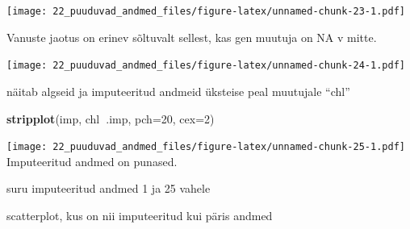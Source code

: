 \documentclass[]{book}
\newenvironment{Shaded}{\begin{snugshade}}{\end{snugshade}}
\newcommand{\KeywordTok}[1]{\textcolor[rgb]{0.13,0.29,0.53}{\textbf{#1}}}
\newcommand{\DataTypeTok}[1]{\textcolor[rgb]{0.13,0.29,0.53}{#1}}
\newcommand{\DecValTok}[1]{\textcolor[rgb]{0.00,0.00,0.81}{#1}}
\newcommand{\StringTok}[1]{\textcolor[rgb]{0.31,0.60,0.02}{#1}}
\newcommand{\OtherTok}[1]{\textcolor[rgb]{0.56,0.35,0.01}{#1}}
\newcommand{\OperatorTok}[1]{\textcolor[rgb]{0.81,0.36,0.00}{\textbf{#1}}}
\newcommand{\NormalTok}[1]{#1}
\begin{document}
\texttt{[image: 22\_puuduvad\_andmed\_files/figure-latex/unnamed-chunk-23-1.pdf]}

Vanuste jaotus on erinev sõltuvalt sellest, kas gen muutuja on NA v
mitte.

\begin{Shaded}
\end{Shaded}

\texttt{[image: 22\_puuduvad\_andmed\_files/figure-latex/unnamed-chunk-24-1.pdf]}

näitab algseid ja imputeeritud andmeid üksteise peal muutujale ``chl''

\begin{Shaded}
\begin{Highlighting}[]
\KeywordTok{stripplot}\NormalTok{(imp, chl}\OperatorTok{~}\NormalTok{.imp, }\DataTypeTok{pch=}\DecValTok{20}\NormalTok{, }\DataTypeTok{cex=}\DecValTok{2}\NormalTok{)}
\end{Highlighting}
\end{Shaded}

\texttt{[image: 22\_puuduvad\_andmed\_files/figure-latex/unnamed-chunk-25-1.pdf]}
Imputeeritud andmed on punased.

suru imputeeritud andmed 1 ja 25 vahele

\begin{Shaded}
\end{Shaded}

scatterplot, kus on nii imputeeritud kui päris andmed
\end{document}
